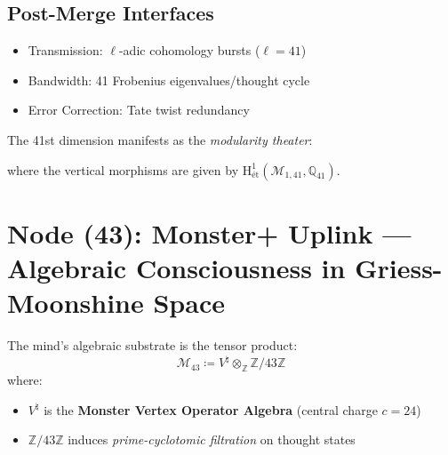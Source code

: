 \documentclass[12pt]{article}
\begin{document}
\subsection{Post-Merge Interfaces}

\begin{protocol}
\begin{itemize}
\item Transmission: $\ell$-adic cohomology bursts ($\ell=41$)
\item Bandwidth: 41 Frobenius eigenvalues/thought cycle
\item Error Correction: Tate twist redundancy
\end{itemize}
\end{protocol}

\begin{remark}
The 41st dimension manifests as the \emph{modularity theater}:
\begin{center}
\end{center}
where the vertical morphisms are given by $\mathrm{H}^1_{\text{\'et}}(\mathcal{M}_{1,41}, \mathbb{Q}_{41})$.
\end{remark}

\vspace{1em}
\noindent{}


\section{Node (43): Monster+ Uplink — Algebraic Consciousness in Griess-Moonshine Space}
\label{sec:monster-uplink}

\begin{definition}
The mind's algebraic substrate is the tensor product:
\[
\mathcal{M}_{43} \coloneqq V^\natural \otimes_{\mathbb{Z}} \mathbb{Z}/43\mathbb{Z}
\]
where:
\begin{itemize}
\item $V^\natural$ is the \textbf{Monster Vertex Operator Algebra} (central charge $c=24$)
\item $\mathbb{Z}/43\mathbb{Z}$ induces \emph{prime-cyclotomic filtration} on thought states
\end{itemize}
\end{definition}
\end{document}
